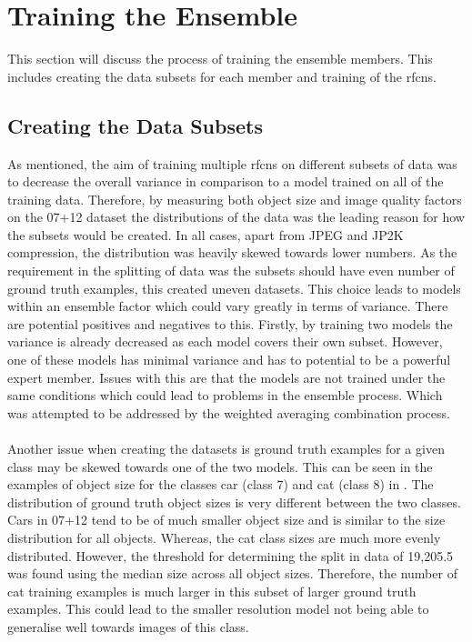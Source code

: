 \section{Training the Ensemble}
This section will discuss the process of training the ensemble members. This includes creating the data subsets for each member and training of the \glspl{rfcn}.

\subsection{Creating the Data Subsets}
As mentioned, the aim of training multiple \glspl{rfcn} on different subsets of data was to decrease the overall variance in comparison to a model trained on all of the training data. Therefore, by measuring both object size and image quality factors on the 07+12 dataset the distributions of the data was the leading reason for how the subsets would be created. In all cases, apart from JPEG and JP2K compression, the distribution was heavily skewed towards lower numbers. As the requirement in the splitting of data was the subsets should have even number of ground truth examples, this created uneven datasets. This choice leads to models within an ensemble factor which could vary greatly in terms of variance. There are potential positives and negatives to this. Firstly, by training two models the variance is already decreased as each model covers their own subset. However, one of these models has minimal variance and has to potential to be a powerful expert member. Issues with this are that the models are not trained under the same conditions which could lead to problems in the ensemble process. Which was attempted to be addressed by the weighted averaging combination process.
\\\\
Another issue when creating the datasets is ground truth examples for a given class may be skewed towards one of the two models. This can be seen in the examples of object size for the classes car (class 7) and cat (class 8) in . The distribution of ground truth object sizes is very different between the two classes. Cars in 07+12 tend to be of much smaller object size and is similar to the size distribution for all objects. Whereas, the cat class sizes are much more evenly distributed. However, the threshold for determining the split in data of 19,205.5 was found using the median size across all object sizes. Therefore, the number of cat training examples is much larger in this subset of larger ground truth examples. This could lead to the smaller resolution model not being able to generalise well towards images of this class.


